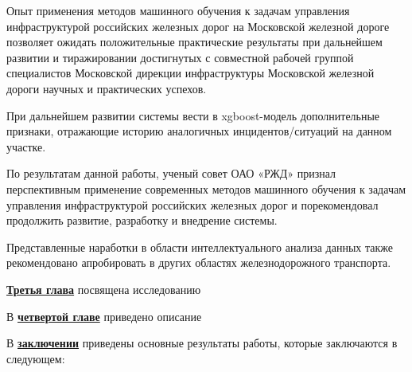 Опыт применения методов машинного обучения к задачам управления инфраструктурой российских железных дорог на Московской железной дороге позволяет ожидать положительные практические результаты при дальнейшем развитии и тиражировании достигнутых с совместной рабочей группой специалистов Московской дирекции инфраструктуры Московской железной дороги научных и практических успехов.

При дальнейшем развитии системы вести в xgboost-модель дополнительные признаки, отражающие историю аналогичных инцидентов/ситуаций на данном участке.

По результатам данной работы, ученый совет ОАО «РЖД» признал перспективным применение современных методов машинного обучения к задачам управления инфраструктурой российских железных дорог и порекомендовал продолжить развитие, разработку и внедрение системы.

Представленные наработки в области интеллектуального анализа данных также рекомендовано апробировать в других областях железнодорожного транспорта.


\underline{\textbf{Третья глава}} посвящена исследованию

В \underline{\textbf{четвертой главе}} приведено описание

В \underline{\textbf{заключении}} приведены основные результаты работы, которые заключаются в следующем:




